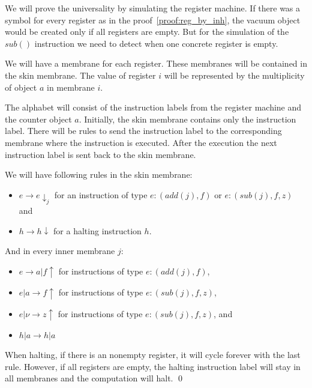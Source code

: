 \begin{dokaz}
  We will prove the universality by simulating the  register machine. If there was a symbol for every register as in the proof~\ref{proof:reg_by_inh}, the vacuum object would be created only if all registers are empty. But for the simulation of the $sub()$ instruction we need to detect when one concrete register is empty.
  
  We will have a membrane for each register. These membranes will be contained in the skin membrane. The value of register $i$ will be represented by the multiplicity of object $a$ in membrane $i$.
  
  The alphabet will consist of the instruction labels from the register machine and the counter object $a$. Initially, the skin membrane contains only the instruction label. There will be rules to send the instruction label to the corresponding membrane where the instruction is executed. After the execution the next instruction label is sent back to the skin membrane.
  
  We will have following rules in the skin membrane:
  
  \begin{itemize}
  \item $e \rightarrow e\downarrow_j$ for an instruction of type $e : (add(j), f)$ or $e : (sub(j), f, z)$ and
  \item $h \rightarrow h\downarrow$ for a halting instruction $h$.
  \end{itemize}
  
  And in every inner membrane $j$:
  
  \begin{itemize}
  \item $e \rightarrow a|f\uparrow$ for instructions of type $e : (add(j), f)$,
  \item $e|a \rightarrow f\uparrow$ for instructions of type $e : (sub(j), f, z)$,
  \item $e|\nu \rightarrow z\uparrow$ for instructions of type $e : (sub(j), f, z)$, and
  \item $h|a \rightarrow h|a$
  \end{itemize}

  When halting, if there is an nonempty register, it will cycle forever with the last rule. However, if all registers are empty, the halting instruction label will stay in all membranes and the computation will halt. \qed  
\end{dokaz}
